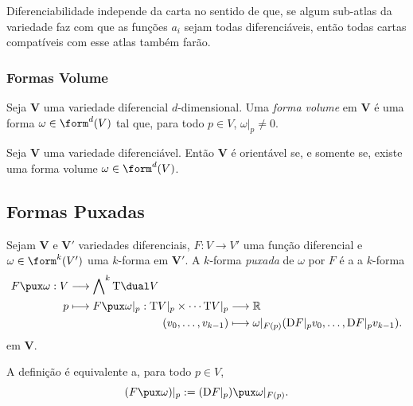 Diferenciabilidade independe da carta no sentido de que, se algum sub-atlas da variedade faz com que as funções $a_i$ sejam todas diferenciáveis, então todas cartas compatíveis com esse atlas também farão.

\subsubsection{Formas Volume}

\begin{defi}
Seja $\bm V$ uma variedade diferencial $d$-dimensional. Uma \emph{forma volume} em $\bm V$ é uma forma $\omega \in \form^d (V)$ tal que, para todo $p \in V$, $\omega|_p \neq 0$.
\end{defi}

\begin{prop}
Seja $\bm V$ uma variedade diferenciável. Então $\bm V$ é orientável se, e somente se, existe uma forma volume $\omega \in \form^d (V)$.
\end{prop}

\subsection{Formas Puxadas}

\begin{defi}
Sejam $\bm V$ e $\bm V'$ variedades diferenciais, $F\colon V \to V'$ uma função diferencial e $\omega \in \form^k (V')$ uma $k$-forma em $\bm V'$. A $k$-forma \emph{puxada} de $\omega$ por $F$ é a a $k$-forma
	\begin{align*}
	\func{F\pux \omega}{V}{\bigwedge\nolimits^k \Tg\dual V}{p}{
	\begin{aligned}[t]
	\func{F\pux \omega|_p}{\Tg V|_p \times \cdots \Tg V|_p}{\R}{(v_0,\ldots,v_{k-1})}{\omega|_{F(p)}(\D F|_p v_0,\ldots,\D F|_p v_{k-1}).}
	\end{aligned}
	}
	\end{align*}
em $\bm V$.
\end{defi}

A definição  é equivalente a, para todo $p \in V$,
	\begin{equation*}
	(F\pux \omega)|_p := (\D F|_p)\pux \omega|_{F(p)}.
	\end{equation*}

